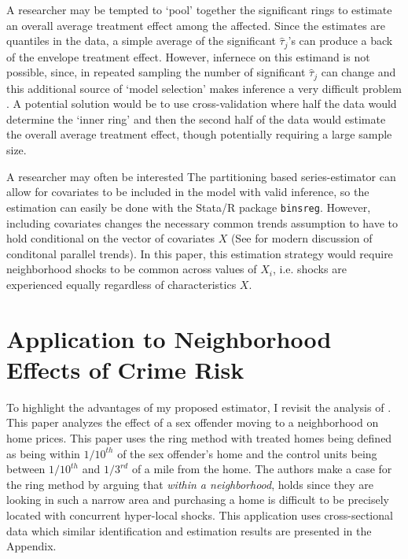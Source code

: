\begin{remark}
A researcher may be tempted to `pool' together the significant rings to estimate an overall average treatment effect among the affected. Since the estimates are quantiles in the data, a simple average of the significant $\hat{\tau}_j$'s can produce a back of the envelope treatment effect. However, infernece on this estimand is not possible, since, in repeated sampling the number of significant $\hat{\tau}_j$ can change and this additional source of `model selection' makes inference a very difficult problem \citep{leeb2005model}. A potential solution would be to use cross-validation where half the data would determine the `inner ring' and then the second half of the data would estimate the overall average treatment effect, though potentially requiring a large sample size.
\end{remark}

\begin{remark}[Covariates]
A researcher may often be interested The partitioning based series-estimator can allow for covariates to be included in the model with valid inference, so the estimation can easily be done with the Stata/R package \texttt{binsreg}. However, including covariates changes the necessary common trends assumption to have to hold conditional on the vector of covariates $X$ (See \citet{santanna2020doubly} for modern discussion of conditonal parallel trends). In this paper, this estimation strategy would require neighborhood shocks to be common across values of $X_i$, i.e. shocks are experienced equally regardless of characteristics $X$.
\end{remark}



\section{Application to Neighborhood Effects of Crime Risk}

To highlight the advantages of my proposed estimator, I revisit the analysis of \citet{Linden_Rockoff_2008}. This paper analyzes the effect of a sex offender moving to a neighborhood on home prices. This paper uses the ring method with treated homes being defined as being within $1/10^{th}$ of the sex offender's home and the control units being between $1/10^{th}$ and $1/3^{rd}$ of a mile from the home. The authors make a case for the ring method by arguing that \textit{within a neighborhood},  holds since they are looking in such a narrow area and purchasing a home is difficult to be precisely located with concurrent hyper-local shocks. This application uses cross-sectional data which similar identification and estimation results are presented in the Appendix.


